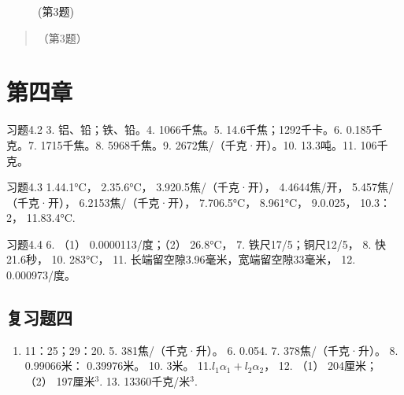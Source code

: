 \begin{figure}
\centering
{}
\caption{(第3题)}
\end{figure}

\begin{quote}
（第3题）
\end{quote}

\section{第四章}\label{ux7b2cux56dbux7ae0}

习题4.2 3. 铝、铅；铁、铅。4. 1066千焦。5. 14.6千焦；1292千卡。6.
0.185千克。7. 1715千焦。8. 5968千焦。9. 2672焦/（千克·开）。10.
13.3吨。11. 106千克。

习题4.3 1.44.1°C， 2.35.6°C， 3.920.5焦/（千克·开）， 4.4644焦/开，
5.457焦/（千克·开）， 6.2153焦/（千克·开）， 7.706.5°C， 8.961°C，
9.0.025， 10.3：2， 11.83.4°C.

习题4.4 6. （1） 0.0000113/度；（2） 26.8°C， 7. 铁尺17/5；铜尺12/5， 8.
快21.6秒， 10. 283°C， 11. 长端留空隙3.96毫米，宽端留空隙33毫米， 12.
0.000973/度。

\subsection{复习题四}\label{ux590dux4e60ux9898ux56db-1}

\begin{enumerate}
\def\labelenumi{\arabic{enumi}.}
\setcounter{enumi}{3}
\tightlist
\item
  11：25；29：20. 5. 381焦/（千克·升）。 6. 0.054. 7.
  378焦/（千克·升）。 8. 0.99066米： 0.39976米。 10. 3米。
  11.\(l_{1}\alpha_{1} + l_{2}\alpha_{2}\)， 12. （1） 204厘米； （2）
  197厘米\(^{3}\). 13. 13360千克/米\(^{3}\).
\end{enumerate}

